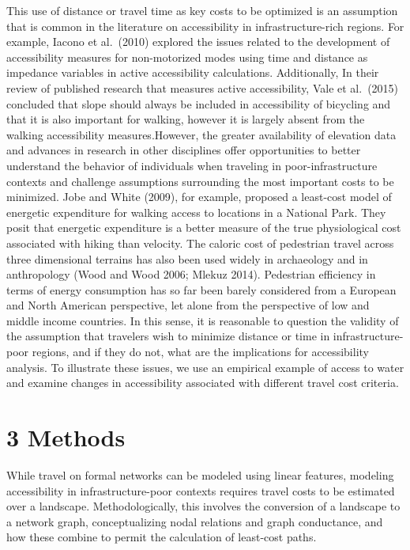 \documentclass[]{elsarticle} %
\begin{document}
This use of distance or travel time as key costs to be optimized is an
assumption that is common in the literature on accessibility in
infrastructure-rich regions. For example, Iacono et al.~(2010) explored
the issues related to the development of accessibility measures for
non-motorized modes using time and distance as impedance variables in
active accessibility calculations. Additionally, In their review of
published research that measures active accessibility, Vale et
al.~(2015) concluded that slope should always be included in
accessibility of bicycling and that it is also important for walking,
however it is largely absent from the walking accessibility
measures.However, the greater availability of elevation data and
advances in research in other disciplines offer opportunities to better
understand the behavior of individuals when traveling in
poor-infrastructure contexts and challenge assumptions surrounding the
most important costs to be minimized. Jobe and White (2009), for
example, proposed a least-cost model of energetic expenditure for
walking access to locations in a National Park. They posit that
energetic expenditure is a better measure of the true physiological cost
associated with hiking than velocity. The caloric cost of pedestrian
travel across three dimensional terrains has also been used widely in
archaeology and in anthropology (Wood and Wood 2006; Mlekuz 2014).
Pedestrian efficiency in terms of energy consumption has so far been
barely considered from a European and North American perspective, let
alone from the perspective of low and middle income countries. In this
sense, it is reasonable to question the validity of the assumption that
travelers wish to minimize distance or time in infrastructure-poor
regions, and if they do not, what are the implications for accessibility
analysis. To illustrate these issues, we use an empirical example of
access to water and examine changes in accessibility associated with
different travel cost criteria.

\hypertarget{methods}{%
\section{3 Methods}\label{methods}}

While travel on formal networks can be modeled using linear features,
modeling accessibility in infrastructure-poor contexts requires travel
costs to be estimated over a landscape. Methodologically, this involves
the conversion of a landscape to a network graph, conceptualizing nodal
relations and graph conductance, and how these combine to permit the
calculation of least-cost paths.
\end{document}
